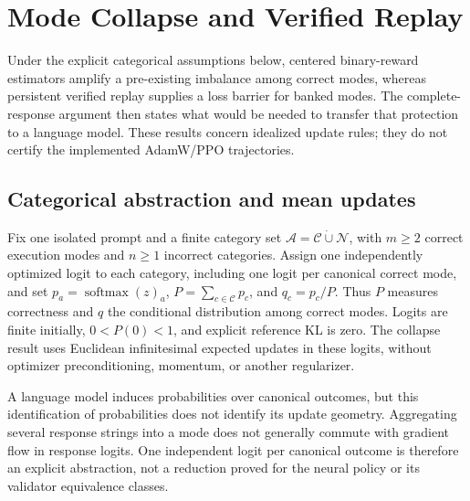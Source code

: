 \documentclass{article}
\newcommand{\1}{\mathbf 1}
\theoremstyle{remark}
\theoremstyle{definition}
\theoremstyle{plain}
\begin{document}

\section{Mode Collapse and Verified Replay}
\label{app:theory}

Under the explicit categorical assumptions below, centered binary-reward
estimators amplify a pre-existing imbalance among correct modes,
whereas persistent verified replay supplies a loss barrier for banked modes.
The complete-response argument then states what would be needed to transfer
that protection to a language model. These results concern idealized update
rules; they do not certify the implemented AdamW/PPO trajectories.

\subsection{Categorical abstraction and mean updates}
\label{app:theory-grpo-mean}

Fix one isolated prompt and a finite category set
$\mathcal A=\mathcal C\mathbin{\dot\cup}\mathcal N$, with $m\ge2$ correct
execution modes and $n\ge1$ incorrect categories. Assign one independently
optimized logit to each category, including one logit per canonical correct
mode, and set $p_a=\operatorname{softmax}(z)_a$,
$P=\sum_{c\in\mathcal C}p_c$, and $q_c=p_c/P$. Thus $P$ measures correctness
and $q$ the conditional distribution among correct modes. Logits are finite
initially, $0<P(0)<1$, and explicit reference KL is zero. The collapse result
uses Euclidean infinitesimal expected updates in these logits, without
optimizer preconditioning, momentum, or another regularizer.

A language model induces probabilities over canonical outcomes, but this
identification of probabilities does not identify its update geometry.
Aggregating several response strings into a mode does not generally commute
with gradient flow in response logits. One independent logit per canonical
outcome is therefore an explicit abstraction, not a reduction proved for the
neural policy or its validator equivalence classes.
\end{document}
